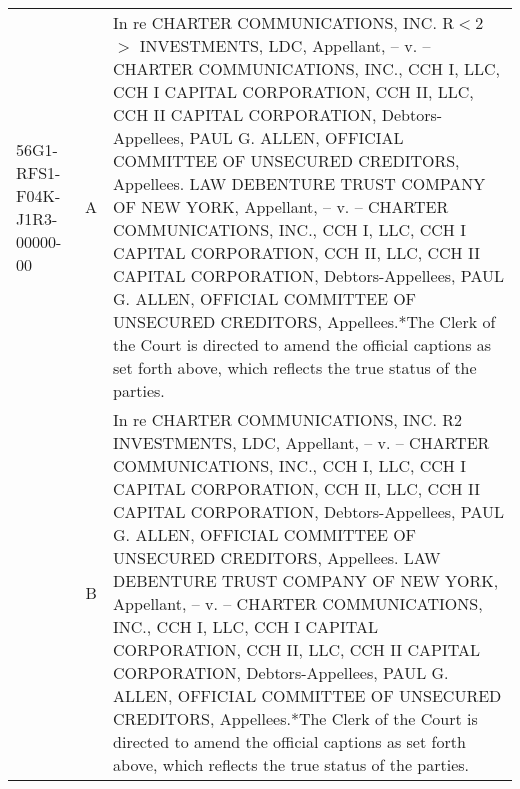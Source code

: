 \documentclass[10pt, letterpaper]{article}
\begin{document}
\begin{spacing}{1.0}
\begin{small}
\begin{longtable}[H]{lcp{4in}}
    56G1-RFS1-F04K-J1R3-00000-00 & A & In re CHARTER COMMUNICATIONS, INC. R$<$2$>$ INVESTMENTS, LDC, Appellant, -- v. -- CHARTER COMMUNICATIONS, INC., CCH I, LLC, CCH I CAPITAL CORPORATION, CCH II, LLC, CCH II CAPITAL CORPORATION, Debtors-Appellees, PAUL G. ALLEN, OFFICIAL COMMITTEE OF UNSECURED CREDITORS, Appellees. LAW DEBENTURE TRUST COMPANY OF NEW YORK, Appellant, -- v. -- CHARTER COMMUNICATIONS, INC., CCH I, LLC, CCH I CAPITAL CORPORATION, CCH II, LLC, CCH II CAPITAL CORPORATION, Debtors-Appellees, PAUL G. ALLEN, OFFICIAL COMMITTEE OF UNSECURED CREDITORS, Appellees.*The Clerk of the Court is directed to amend the official captions as set forth above, which reflects the true status of the parties.\\[4pt] & B & In re CHARTER COMMUNICATIONS, INC. R2 INVESTMENTS, LDC, Appellant, -- v. -- CHARTER COMMUNICATIONS, INC., CCH I, LLC, CCH I CAPITAL CORPORATION, CCH II, LLC, CCH II CAPITAL CORPORATION, Debtors-Appellees, PAUL G. ALLEN, OFFICIAL COMMITTEE OF UNSECURED CREDITORS, Appellees. LAW DEBENTURE TRUST COMPANY OF NEW YORK, Appellant, -- v. -- CHARTER COMMUNICATIONS, INC., CCH I, LLC, CCH I CAPITAL CORPORATION, CCH II, LLC, CCH II CAPITAL CORPORATION, Debtors-Appellees, PAUL G. ALLEN, OFFICIAL COMMITTEE OF UNSECURED CREDITORS, Appellees.*The Clerk of the Court is directed to amend the official captions as set forth above, which reflects the true status of the parties.\\[6pt]

\end{longtable}
\end{small}
\end{spacing}
\end{document}
